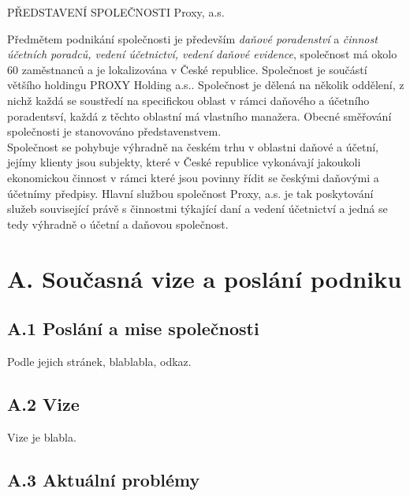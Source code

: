\maketitle
\thispagestyle{fancy}

\begin{lefttextpipe}
	{\huge PŘEDSTAVENÍ SPOLEČNOSTI Proxy, a.s.}
\end{lefttextpipe}

Předmětem podnikání společnosti je především \textit{daňové poradenství} a \textit{činnost účetních poradců, vedení účetnictví, vedení daňové evidence}, společnost má okolo 60 zaměstnanců a je lokalizována v České republice. Společnost je součástí většího holdingu PROXY Holding a.s.. Společnost je dělená na několik oddělení, z nichž každá se soustředí na specifickou oblast v rámci daňového a účetního poradentsví, každá z těchto oblastní má vlastního manažera. Obecné směřování společnosti je stanovováno představenstvem.\\

Společnost se pohybuje výhradně na českém trhu v oblastni daňové a účetní, jejímy klienty jsou subjekty, které v České republice vykonávají jakoukoli ekonomickou činnost v rámci které jsou povinny řídit se českými daňovými a účetnímy předpisy. Hlavní službou společnost Proxy, a.s. je tak poskytování služeb související právě s činnostmi týkající daní a vedení účetnictví a jedná se tedy výhradně o účetní a daňovou společnost.

\section*{A. Současná vize a poslání podniku}

\subsection*{A.1 Poslání a mise společnosti}

Podle jejich stránek, blablabla, odkaz.

\subsection*{A.2 Vize}

Vize je blabla.

\subsection*{A.3 Aktuální problémy}


